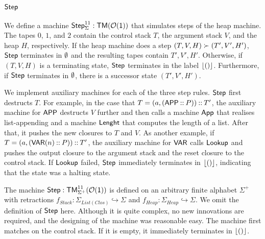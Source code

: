 \subsection{$\mathsf{Step}$}
\label{sec:heap-Step}
%


We define a machine $\mathsf{Step}_\Sigma^{11} : \mathsf{TM}(\mathcal{O}(\mathsf{1}))$ that simulates steps of the heap machine.  The tapes $0$, $1$, and $2$ contain the
control stack $T$, the argument stack $V$, and the heap $H$, respectively.  If the heap machine does a step $(T,V,H) \succ (T',V',H')$, $\mathsf{Step}$
terminates in $\emptyset$ and the resulting tapes contain $T',V',H'$.  Otherwise, if $(T,V,H)$ is a terminating state, $\mathsf{Step}$ terminates in the label
$\left\lfloor {\ensuremath{\mathsf{()}}} \right\rfloor$.  Furthermore, if $\mathsf{Step}$ terminates in $\emptyset$, there is a successor state $(T',V',H')$.

We implement auxiliary machines for each of the three step rules.  $\mathsf{Step}$ first destructs $T$.  For example, in the case that
$T=(a, (\mathsf{APP} \mathbin{::} P)) \mathbin{::} T'$, the auxiliary machine for $\mathsf{APP}$ destructs $V$ further and then calls a machine $\mathsf{App}$ that realises
list-appending and a machine $\mathsf{Lenght}$ that computes the length of a list.  After that, it pushes the new closures to $T$ and $V$.  As another
example, if $T=(a, (\mathsf{VAR}(n) \mathbin{::} P)) \mathbin{::} T'$, the auxiliary machine for $\mathsf{VAR}$ calls $\mathsf{Lookup}$ and pushes the output closure to the
argument stack and the reset closure to the control stack.  If $\mathsf{Lookup}$ failed, $\mathsf{Step}$ immediately terminates in $\left\lfloor {\ensuremath{\mathsf{()}}} \right\rfloor$, indicating
that the state was a halting state.

The machine $\mathsf{Step} : \mathsf{TM}_{\Sigma^+}^{11}(\mathcal{O}(\mathsf{1}))$ is defined on an arbitrary finite alphabet $\Sigma^+$ with retractions
$f_{Stack} : \Sigma_{List(Clos)} \hookrightarrow \Sigma$ and $f_{Heap} : \Sigma_{Heap} \hookrightarrow \Sigma$.  We omit the definition of $\mathsf{Step}$
here.  Although it is quite complex, no new innovations are required, and the designing of the machine was reasonable easy.  The machine first matches
on the control stack.  If it is empty, it immediately terminates in $\left\lfloor {\ensuremath{\mathsf{()}}} \right\rfloor$.

